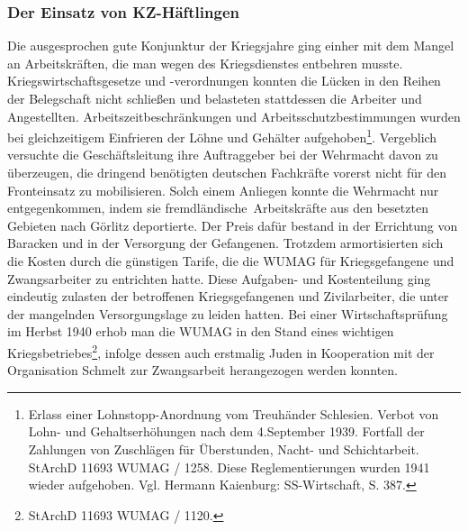 \documentclass[a4paper,12pt,ngerman,
]{nisebook}
\begin{document}
\subsubsection{Der Einsatz von KZ-Häftlingen}
Die ausgesprochen gute Konjunktur der Kriegsjahre ging einher mit dem Mangel an Arbeitskräften, die man wegen des Kriegsdienstes entbehren musste. Kriegswirtschaftsgesetze und \mbox{-verordnungen} konnten die Lücken in den Reihen der Belegschaft nicht schließen und belasteten stattdessen die Arbeiter und Angestellten. Arbeitszeitbeschränkungen und Arbeitsschutzbestimmungen wurden bei gleichzeitigem Einfrieren der Löhne und Gehälter aufgehoben\footnote{Erlass einer Lohnstopp-Anordnung vom Treuhänder Schlesien. Verbot von Lohn- und Gehaltserhöhungen nach dem 4.September 1939. Fortfall der Zahlungen von Zuschlägen für Überstunden, Nacht- und Schichtarbeit. StArchD 11693 WUMAG / 1258. Diese Reglementierungen wurden 1941 wieder aufgehoben. Vgl. Hermann Kaienburg: SS-Wirtschaft, S. 387.}. Vergeblich versuchte die Geschäftsleitung ihre Auftraggeber bei der Wehrmacht davon zu überzeugen, die dringend benötigten deutschen Fachkräfte vorerst nicht für den Fronteinsatz zu mobilisieren. Solch einem Anliegen konnte die Wehrmacht nur entgegenkommen, indem sie \glqq fremdländische\grqq~Arbeitskräfte aus den besetzten Gebieten nach Görlitz deportierte. Der Preis dafür bestand in der Errichtung von Baracken und in der Versorgung der Gefangenen. Trotzdem armortisierten sich die Kosten durch die günstigen Tarife, die die WUMAG für Kriegsgefangene und Zwangsarbeiter zu entrichten hatte. Diese Aufgaben- und Kostenteilung ging eindeutig zulasten der betroffenen Kriegsgefangenen und Zivilarbeiter, die unter der mangelnden Versorgungslage zu leiden hatten.
\newline
Bei einer Wirtschaftsprüfung im Herbst 1940 erhob man die WUMAG in den Stand eines wichtigen Kriegsbetriebes\footnote{StArchD 11693 WUMAG / 1120.}, infolge dessen auch erstmalig Juden in Kooperation mit der Organisation Schmelt zur Zwangsarbeit herangezogen werden konnten.
\end{document}
